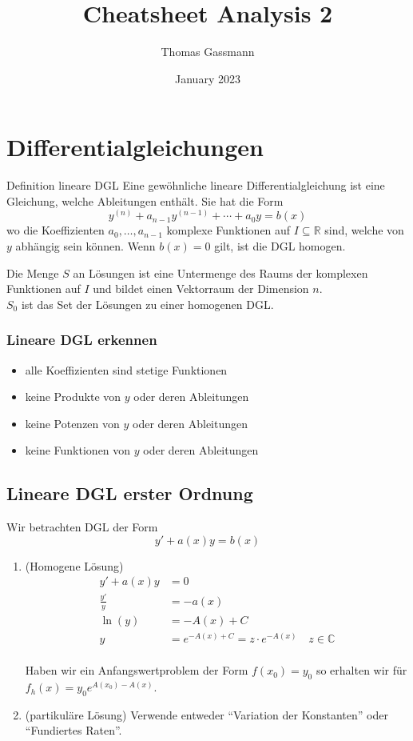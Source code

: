\documentclass[a4paper,10pt]{article}
\title{Cheatsheet Analysis 2}
\author{Thomas Gassmann}
\date{January 2023}
\def\R{\mathbb{R}}
\def\C{\mathbb{C}}
\begin{document}


\section{Differentialgleichungen}
\begin{mainbox}{Definition lineare DGL}
  Eine gewöhnliche lineare Differentialgleichung ist eine Gleichung, welche Ableitungen enthält. Sie hat die Form \[y^{(n)} + a_{n-1} y^{(n-1)} + \cdots + a_0y = b(x)\]
  wo die Koeffizienten \(a_0, \ldots, a_{n-1}\) komplexe Funktionen auf \(I \subseteq \R\) sind, welche von \(y\) abhängig sein können. Wenn \(b(x) = 0\) gilt, ist die DGL homogen.
\end{mainbox}

Die Menge $S$ an Lösungen ist eine Untermenge des Raums der komplexen Funktionen auf $I$ und bildet einen Vektorraum der Dimension $n$.\\
\(S_0\) ist das Set der Lösungen zu einer homogenen DGL.

\subsubsection*{Lineare DGL erkennen}
\begin{itemize}
  \item alle Koeffizienten sind stetige Funktionen
  \item keine Produkte von $y$ oder deren Ableitungen
  \item keine Potenzen von $y$ oder deren Ableitungen
  \item keine Funktionen von $y$ oder deren Ableitungen
\end{itemize}

\subsection{Lineare DGL erster Ordnung}
Wir betrachten DGL der Form \[y' + a(x)y = b(x)\]
\begin{enumerate}
  \item (Homogene Lösung) 
  \begin{align*}
    y' + a(x)y &= 0\\
    \frac{y'}{y} &= -a(x)\\
    \ln(y) &= -A(x)+C\\
    y &= e^{-A(x)+C} = z \cdot e^{-A(x)}\quad z \in \C
  \end{align*}\\
  Haben wir ein Anfangswertproblem der Form $f(x_0) = y_0$ so erhalten wir für $f_h(x) = y_0 e^{A(x_0) - A(x)}$.
  \item (partikuläre Lösung) Verwende entweder ``Variation der Konstanten'' oder ``Fundiertes Raten''.
\end{enumerate}
\end{document}
